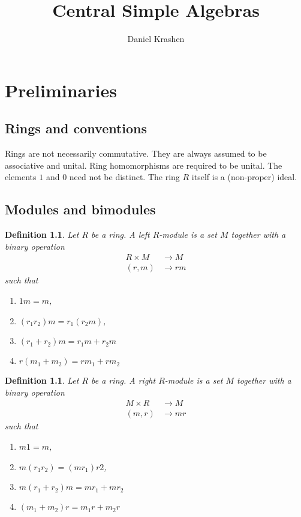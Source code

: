 \documentclass[12pt]{report}
\theoremstyle{plain}
\newtheorem{defn}[thm]{Definition}
\begin{document}
\author{Daniel Krashen}

\title{Central Simple Algebras}

\maketitle

\tableofcontents



\chapter{Preliminaries}

\section{Rings and conventions}

Rings are not necessarily commutative. They are always assumed to be
associative and unital. Ring homomorphisms are required to be unital. The
elements $1$ and $0$ need not be distinct. The ring $R$ itself is a
(non-proper) ideal.

\section{Modules and bimodules}

\begin{defn}
Let $R$ be a ring. A left $R$-module is a set $M$ together with a binary
operation
\begin{align*}
R \times M &\to M \\
(r, m) &\to rm
\end{align*}
such that
\begin{enumerate}[1. ]
\item $1 m = m$, 
\item $(r_1 r_2) m = r_1 (r_2 m)$, 
\item $(r_1 + r_2)m = r_1m + r_2 m$
\item $r(m_1 + m_2) = rm_1 + rm_2$
\end{enumerate}
\end{defn}

\begin{defn}
Let $R$ be a ring. A right $R$-module is a set $M$ together with a binary
operation
\begin{align*}
M \times R &\to M \\
(m, r) &\to mr
\end{align*}
such that
\begin{enumerate}[1. ]
\item $m 1 = m$, 
\item $m (r_1 r_2) = (m r_1) r2$, 
\item $m (r_1 + r_2)m = m r_1 + m r_2$
\item $(m_1 + m_2)r = m_1 r + m_2 r$
\end{enumerate}
\end{defn}
\end{document}
